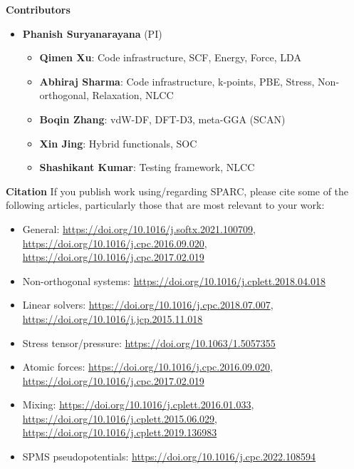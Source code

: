   \begin{frame}[allowframebreaks]{\textbf{Contributors}} \label{Contributors}

	\begin{itemize}
	\item \textbf{Phanish Suryanarayana} (PI)
	\begin{itemize}
 	\item \textbf{Qimen Xu}: Code infrastructure, SCF, Energy, Force, LDA \\  
 	\item \textbf{Abhiraj Sharma}: Code infrastructure, k-points, PBE, Stress, Non-orthogonal, Relaxation, NLCC \\   
 	\item \textbf{Boqin Zhang}: vdW-DF, DFT-D3, meta-GGA (SCAN) \\  
 	\item \textbf{Xin Jing}: Hybrid functionals, SOC \\  
 	\item \textbf{Shashikant Kumar}: Testing framework, NLCC \\  
 	\end{itemize}
 	\end{itemize}


  
\end{frame}


\begin{frame}[allowframebreaks]{\textbf{Citation}} \label{Citation}
If you publish work using/regarding SPARC, please cite some of the following articles, particularly those that are most relevant to your work:
\begin{itemize}
    \item General: \url{https://doi.org/10.1016/j.softx.2021.100709}, \url{https://doi.org/10.1016/j.cpc.2016.09.020}, \url{https://doi.org/10.1016/j.cpc.2017.02.019}
    \item Non-orthogonal systems: \url{https://doi.org/10.1016/j.cplett.2018.04.018}
    \item Linear solvers: \url{https://doi.org/10.1016/j.cpc.2018.07.007},    \url{https://doi.org/10.1016/j.jcp.2015.11.018}
    \item Stress tensor/pressure: \url{https://doi.org/10.1063/1.5057355}
    \item Atomic forces: \url{https://doi.org/10.1016/j.cpc.2016.09.020}, \url{https://doi.org/10.1016/j.cpc.2017.02.019}
    \item Mixing: \url{https://doi.org/10.1016/j.cplett.2016.01.033}, \url{https://doi.org/10.1016/j.cplett.2015.06.029}, \url{https://doi.org/10.1016/j.cplett.2019.136983}
    \item SPMS pseudopotentials: \url{https://doi.org/10.1016/j.cpc.2022.108594}
\end{itemize}
\end{frame}
  
